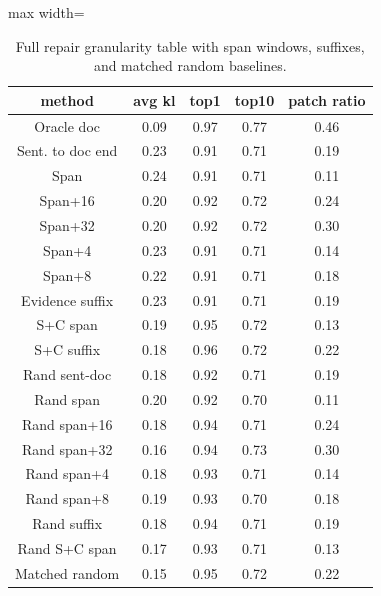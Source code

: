 \begin{table}[t]
\centering
\footnotesize
\begin{adjustbox}{max width=\textwidth}
\begin{tabular}{ccccc}
\toprule
method & avg kl & top1 & top10 & patch ratio \\
\midrule
Oracle doc & 0.09 & 0.97 & 0.77 & 0.46 \\
Sent. to doc end & 0.23 & 0.91 & 0.71 & 0.19 \\
Span & 0.24 & 0.91 & 0.71 & 0.11 \\
Span+16 & 0.20 & 0.92 & 0.72 & 0.24 \\
Span+32 & 0.20 & 0.92 & 0.72 & 0.30 \\
Span+4 & 0.23 & 0.91 & 0.71 & 0.14 \\
Span+8 & 0.22 & 0.91 & 0.71 & 0.18 \\
Evidence suffix & 0.23 & 0.91 & 0.71 & 0.19 \\
S+C span & 0.19 & 0.95 & 0.72 & 0.13 \\
S+C suffix & 0.18 & 0.96 & 0.72 & 0.22 \\
Rand sent-doc & 0.18 & 0.92 & 0.71 & 0.19 \\
Rand span & 0.20 & 0.92 & 0.70 & 0.11 \\
Rand span+16 & 0.18 & 0.94 & 0.71 & 0.24 \\
Rand span+32 & 0.16 & 0.94 & 0.73 & 0.30 \\
Rand span+4 & 0.18 & 0.93 & 0.71 & 0.14 \\
Rand span+8 & 0.19 & 0.93 & 0.70 & 0.18 \\
Rand suffix & 0.18 & 0.94 & 0.71 & 0.19 \\
Rand S+C span & 0.17 & 0.93 & 0.71 & 0.13 \\
Matched random & 0.15 & 0.95 & 0.72 & 0.22 \\
\bottomrule
\end{tabular}
\end{adjustbox}
\caption{Full repair granularity table with span windows, suffixes, and matched random baselines.}
\label{tab:app-repair}
\end{table}
